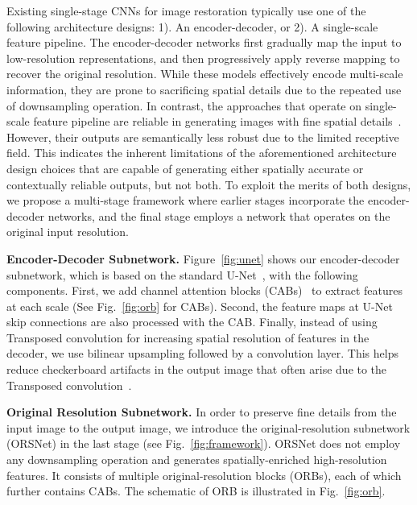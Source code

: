 \documentclass[10pt,twocolumn,letterpaper]{article}
\begin{document}
Existing single-stage CNNs for image restoration typically use one of the following architecture designs: 1). An encoder-decoder, or 2). A single-scale feature pipeline. 
The encoder-decoder networks \cite{Brooks2019,Chen2018, deblurganv2,ronneberger2015unet} first gradually map the input to low-resolution representations, and then progressively apply reverse mapping to recover the original resolution. 
While these models effectively encode multi-scale information, they are prone to sacrificing spatial details due to the repeated use of downsampling operation. 
In contrast, the approaches that operate on single-scale feature pipeline are reliable in generating images with fine spatial details~\cite{anwar2019deep,dong2015image,DnCNN,zhang2020rdn}.
However, their outputs are semantically less robust due to the limited receptive field.  
This indicates the inherent limitations of the aforementioned architecture design choices that are capable of generating either spatially accurate or contextually reliable outputs, but not both. 
To exploit the merits of both designs, we propose a multi-stage framework where earlier stages incorporate the encoder-decoder networks, and the final stage employs a network that operates on the original input resolution. 

\vspace{0.4em}\noindent\textbf{Encoder-Decoder Subnetwork.}
Figure~\ref{fig:unet} shows our encoder-decoder subnetwork, which is based on the standard U-Net~\cite{ronneberger2015unet}, with the following components. 
First, we add channel attention blocks (CABs)~\cite{RCAN} to extract features at each scale (See Fig.~\ref{fig:orb} for CABs).
Second, the feature maps at U-Net skip connections are also processed with the CAB.
Finally, instead of using Transposed convolution for increasing spatial resolution of features in the decoder, we use bilinear upsampling followed by a convolution layer. 
This helps reduce checkerboard artifacts in the output image that often arise due to the Transposed convolution~\cite{Odena2016}.  


\vspace{0.4em}\noindent\textbf{Original Resolution Subnetwork.}
In order to preserve fine details from the input image to the output image, we introduce the original-resolution subnetwork (ORSNet) in the last stage (see Fig.~\ref{fig:framework}). ORSNet does not employ any downsampling operation and generates spatially-enriched high-resolution features. It consists of multiple original-resolution blocks (ORBs), each of which further contains CABs.  The schematic of ORB is illustrated in Fig.~\ref{fig:orb}. 
\end{document}
